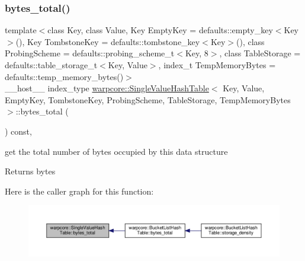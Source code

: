 \subsubsection{\texorpdfstring{bytes\+\_\+total()}{bytes\_total()}}
{\footnotesize\ttfamily template$<$class Key, class Value, Key Empty\+Key = defaults\+::empty\+\_\+key$<$\+Key$>$(), Key Tombstone\+Key = defaults\+::tombstone\+\_\+key$<$\+Key$>$(), class Probing\+Scheme = defaults\+::probing\+\_\+scheme\+\_\+t$<$\+Key, 8$>$, class Table\+Storage = defaults\+::table\+\_\+storage\+\_\+t$<$\+Key, Value$>$, index\+\_\+t Temp\+Memory\+Bytes = defaults\+::temp\+\_\+memory\+\_\+bytes()$>$ \\
\+\_\+\+\_\+host\+\_\+\+\_\+ index\+\_\+type \hyperlink{classwarpcore_1_1SingleValueHashTable}{warpcore\+::\+Single\+Value\+Hash\+Table}$<$ Key, Value, Empty\+Key, Tombstone\+Key, Probing\+Scheme, Table\+Storage, Temp\+Memory\+Bytes $>$\+::bytes\+\_\+total (\begin{DoxyParamCaption}{ }\end{DoxyParamCaption}) const\hspace{0.3cm}{\ttfamily [inline]}, {\ttfamily [noexcept]}}



get the total number of bytes occupied by this data structure 

\begin{DoxyReturn}{Returns}
bytes 
\end{DoxyReturn}
Here is the caller graph for this function\+:
\nopagebreak
\begin{figure}[H]
\begin{center}
\leavevmode
\includegraphics[width=350pt]{classwarpcore_1_1SingleValueHashTable_a1d50d30af5f5e85bbc216219ed282da5_icgraph}
\end{center}
\end{figure}
\mbox{\label{classwarpcore_1_1SingleValueHashTable_a9804486b8ec4f3c72293e19c722e4df2}} 
